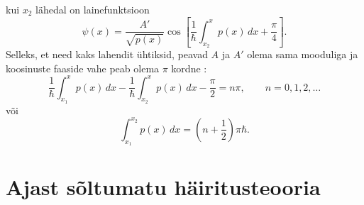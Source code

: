 \documentclass{trkut}%
\begin{document}
kui $x_2$ lähedal on lainefunktsioon
\begin{equation}
    \psi(x)=\frac{A'}{\sqrt{p(x)}} \cos \left[ \frac{1}{\hbar}\int_{x_2}^{x} p(x)\, dx + \frac{\pi}{4} \right].
\end{equation}
Selleks, et need kaks lahendit ühtiksid, peavad $A$ ja $A'$ olema sama mooduliga ja koosinuste faaside vahe peab olema $\pi$ kordne \parencite[446]{shankar94}:
\begin{equation}
    \frac{1}{\hbar}\int_{x_1}^{x} p(x)\, dx - \frac{1}{\hbar}\int_{x_2}^{x} p(x)\, dx - \frac{\pi}{2} = n\pi, \qquad n=0, 1, 2, \dots
\end{equation}
või
\begin{equation}
    \int_{x_1}^{x_2} p(x)\, dx =\left(n+\frac{1}{2}\right)\pi \hbar.
\end{equation}



\section{Ajast sõltumatu häiritusteooria}
\end{document}
